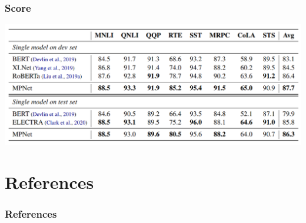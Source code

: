 \documentclass{beamer}
\begin{document}
\begin{frame}
    \frametitle{Score}
    \begin{center}
        \includegraphics[scale=0.25]{img/mpnet_score.png}
    \end{center}
\end{frame}





\section{References}
\begin{frame}[allowframebreaks,t]
    \tiny
    \frametitle{References}
    
    
\end{frame}
\end{document}

